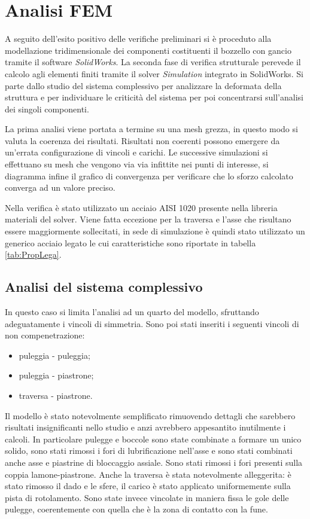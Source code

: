 \section{Analisi FEM}
A seguito dell'esito positivo delle verifiche preliminari si è proceduto alla modellazione tridimensionale dei componenti costituenti il bozzello con gancio tramite il software \textit{SolidWorks}.
La seconda fase di verifica strutturale perevede il calcolo agli elementi finiti tramite il solver \textit{Simulation} integrato in SolidWorks. 
Si parte dallo studio del sistema complessivo per analizzare la deformata della struttura e per individuare le criticità del sistema per poi concentrarsi sull'analisi dei singoli componenti. 

La prima analisi viene portata a termine su una mesh grezza, in questo modo si valuta la coerenza dei risultati. Risultati non coerenti possono emergere da un'errata configurazione di vincoli e carichi. Le successive simulazioni si effettuano su mesh che vengono via via infittite nei punti di interesse, si diagramma infine il grafico di convergenza per verificare che lo sforzo calcolato converga ad un valore preciso. 

Nella verifica è stato utilizzato un acciaio AISI 1020 presente nella libreria materiali del solver. Viene fatta eccezione per la traversa e l'asse che risultano essere maggiormente sollecitati, in sede di simulazione è quindi stato utilizzato un generico acciaio legato le cui caratteristiche sono riportate in tabella \ref{tab:PropLega}.

\subsection{Analisi del sistema complessivo}
In questo caso si limita l'analisi ad un quarto del modello, sfruttando adeguatamente i vincoli di simmetria. Sono poi stati inseriti i seguenti vincoli di non compenetrazione:
\begin{itemize}
\item puleggia - puleggia;
\item puleggia - piastrone;
\item traversa - piastrone.
\end{itemize}
Il modello è stato notevolmente semplificato rimuovendo dettagli che sarebbero risultati insignificanti nello studio e anzi avrebbero appesantito inutilmente i calcoli. 
In particolare pulegge e boccole sono state combinate a formare un unico solido, sono stati rimossi i fori di lubrificazione nell'asse e sono stati combinati anche asse e piastrine di bloccaggio assiale. Sono stati rimossi i fori presenti sulla coppia lamone-piastrone. 
Anche la traversa è stata notevolmente alleggerita: è stato rimosso il dado e le sfere, il carico è stato applicato uniformemente sulla pista di rotolamento. 
Sono state invece vincolate in maniera fissa le gole delle pulegge, coerentemente con quella che è la zona di contatto con la fune. 

